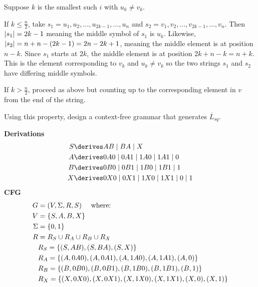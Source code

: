 \begin{problem}
\begin{enumalph}
\begin{Answer}
        \step
        Suppose $k$ is the smallest such $i$ with $u_k \ne v_k$.
        \begin{enumroman}
          \item If $k \le \frac{n}{2}$, take
            $s_1 = u_1, u_2, \ldots, u_{2k-1}, \ldots, u_n$
            and $s_2 = v_1, v_2, \ldots, v_{2k-1}, \ldots, v_n$.
            Then $\lvert s_1\rvert = 2k-1$ meaning the middle symbol of $s_1$
            is $u_{k}$. Likewise, $\lvert s_2\rvert = n + n-(2k - 1) = 2n - 2k + 1$,
            meaning the middle element is at position $n - k$.
            Since $s_1$ starts at $2k$, the middle element is at position
            $2k + n - k = n + k$.
            This is the element corresponding to $v_k$ and $u_k \ne v_k$
            so the two strings $s_1$ and $s_2$ have differing middle symbols.
          \item If $k > \frac{n}{2}$, proceed as above but counting up to the
            corresponding element in $v$ from the end of the string.
        \end{enumroman}
      \end{Answer}
    \item Using this property, design a context-free grammar that
      generates $\overline{L}_{sq}$.
      \begin{Answer}
        \textbf{Derivations}
        \begin{align*}
          S &\derives AB \mid BA \mid X \\
          A &\derives 0A0 \mid 0A1 \mid 1A0 \mid 1A1 \mid 0 \\
          B &\derives 0B0 \mid 0B1 \mid 1B0 \mid 1B1 \mid 1 \\
          X &\derives 0X0 \mid 0X1 \mid 1X0 \mid 1X1 \mid 0 \mid 1
        \end{align*}
        \textbf{CFG}
        \begin{align*}
          G &= (V, \Sigma, R, S) \quad \text{ where: } \\
          V &= \left\{S, A, B, X\right\} \\
          \Sigma &= \left\{0, 1\right\} \\
          R &= R_S \cup R_A \cup R_B \cup R_X \\
          &R_S = \left\{(S, AB), (S, BA), (S, X)\right\} \\
          &R_A = \left\{(A, 0A0), (A, 0A1), (A, 1A0), (A, 1A1), (A, 0)\right\} \\
          &R_B = \left\{(B, 0B0), (B, 0B1), (B, 1B0), (B, 1B1), (B, 1)\right\} \\
          &R_X = \left\{(X, 0X0), (X, 0X1), (X, 1X0), (X, 1X1), (X, 0), (X, 1)\right\}
        \end{align*}


\end{Answer}
\end{enumalph}
\end{problem}
